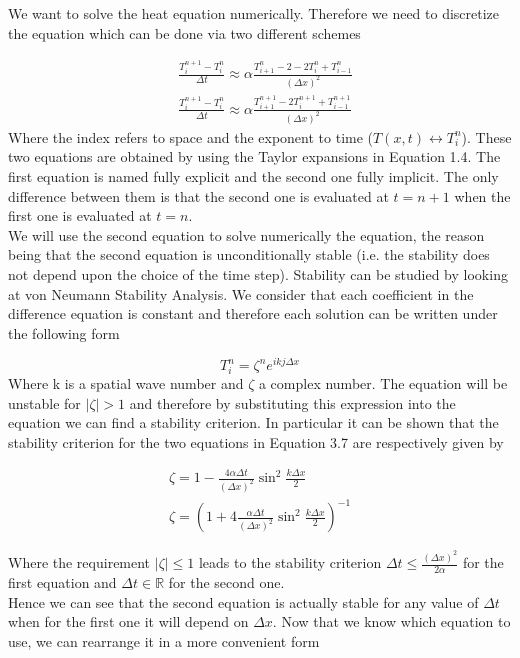 \documentclass[10 pt]{article}
\numberwithin{equation}{section}
\begin{document}
\begin{multicols}{2}
We want to solve the heat equation numerically. Therefore we need to discretize the equation which can be done via two different schemes\cite{NumHeat}

\begin{equation}
\begin{split}
&\frac{T_i^{n+1} - T_i^n}{\Delta t} \approx \alpha \frac{T_{i+1}^n - 2 - 2T_i^n + T_{i-1}^n}{(\Delta x)^2}\\
&\frac{T_i^{n+1} - T_i^n}{\Delta t} \approx \alpha \frac{T_{i+1}^{n+1} - 2T_i^{n+1} + T_{i-1}^{n+1}}{(\Delta x)^2}
\end{split}
\end{equation}
Where the index refers to space and the exponent to time ($T(x,t) \leftrightarrow T_i^n$).
These two equations are obtained by using the Taylor expansions in Equation 1.4. The first equation is named fully explicit and the second one fully implicit. The only difference between them is that the second one is evaluated at $t = n+1$ when the first one is evaluated at $t=n$.\\
We will use the second equation to solve numerically the equation, the reason being that the second equation is unconditionally stable (i.e. the stability does not depend upon the choice of the time step). Stability can be studied by looking at von Neumann Stability Analysis\cite{NumStab}. We consider that each coefficient in the difference equation is constant and therefore each solution can be written under the following form

\begin{equation}
 T_i^n = \zeta ^n e^{ikj \Delta x}
\end{equation}
Where k is a spatial wave number and $\zeta$ a complex number. The equation will be unstable for $| \zeta | > 1$ and therefore by substituting this expression into the equation we can find a stability criterion. In particular it can be shown that the stability criterion for the two equations in Equation 3.7 are respectively given by\cite{NumHeat}

\begin{equation}
\begin{gathered}
\zeta = 1 - \frac{4\alpha \Delta t}{(\Delta x)^2} \sin ^2 \frac{k \Delta x}{2}\\
\zeta = \left ( 1 + 4 \frac{\alpha \Delta t}{(\Delta x)^2} \sin ^2 \frac{k \Delta x}{2} \right )^{-1}
\end{gathered}
\end{equation}

Where the requirement $| \zeta | \leq 1$ leads to the stability criterion $\Delta t \leq \frac{(\Delta x)^2}{2\alpha}$ for the first equation and $\Delta t \in \mathbb{R} $ for the second one.\\
Hence we can see that the second equation is actually stable for any value of $\Delta t$ when for the first one it will depend on $\Delta x$. Now that we know which equation to use, we can rearrange it in a more convenient form


\end{multicols}
\end{document}
